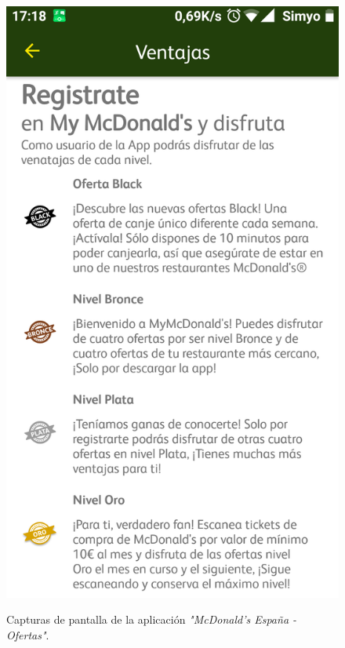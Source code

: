 \documentclass[twoside]{report}
\begin{document}
\begin{figure}[H]
\begin{center}
\includegraphics[scale=0.25]{images/restaurantes/mcdo3.png}
\caption{Capturas de pantalla de la aplicación \textit{"McDonald's España - Ofertas"}.} \cite{mcdo}
\end{center}
\end{figure}
\end{document}
